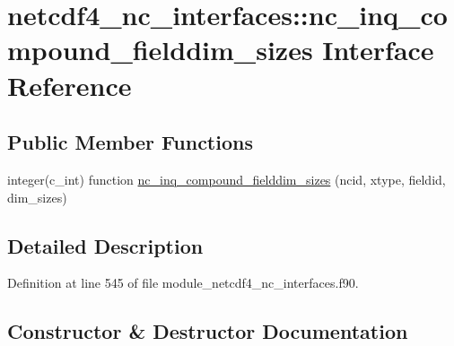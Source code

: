 \hypertarget{interfacenetcdf4__nc__interfaces_1_1nc__inq__compound__fielddim__sizes}{}\section{netcdf4\+\_\+nc\+\_\+interfaces\+:\+:nc\+\_\+inq\+\_\+compound\+\_\+fielddim\+\_\+sizes Interface Reference}
\label{interfacenetcdf4__nc__interfaces_1_1nc__inq__compound__fielddim__sizes}
\subsection*{Public Member Functions}
\begin{DoxyCompactItemize}
\item 
integer(c\+\_\+int) function \hyperlink{interfacenetcdf4__nc__interfaces_1_1nc__inq__compound__fielddim__sizes_a7220aecf64b60b17b8fda3dddfcbf970}{nc\+\_\+inq\+\_\+compound\+\_\+fielddim\+\_\+sizes} (ncid, xtype, fieldid, dim\+\_\+sizes)
\end{DoxyCompactItemize}


\subsection{Detailed Description}


Definition at line 545 of file module\+\_\+netcdf4\+\_\+nc\+\_\+interfaces.\+f90.



\subsection{Constructor \& Destructor Documentation}
\mbox{\label{interfacenetcdf4__nc__interfaces_1_1nc__inq__compound__fielddim__sizes_a7220aecf64b60b17b8fda3dddfcbf970}} 
